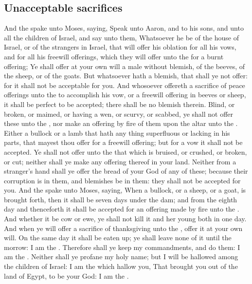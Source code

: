 \begin{biblechapter}
\section*{Unacceptable sacrifices}
\verse And the \LORD spake unto Moses, saying,
\verse Speak unto Aaron, and to his sons, and unto all the children of Israel, and say unto them, Whatsoever he be of the house of Israel, or of the strangers in Israel, that will offer his oblation for all his vows, and for all his freewill offerings, which they will offer unto the \LORD for a burnt offering;
\verse Ye shall offer at your own will a male without blemish, of the beeves, of the sheep, or of the goats.
\verse But whatsoever hath a blemish, that shall ye not offer: for it shall not be acceptable for you.
\verse And whosoever offereth a sacrifice of peace offerings unto the \LORD to accomplish his vow, or a freewill offering in beeves or sheep, it shall be perfect to be accepted; there shall be no blemish therein.
\verse Blind, or broken, or maimed, or having a wen, or scurvy, or scabbed, ye shall not offer these unto the \LORD, nor make an offering by fire of them upon the altar unto the \LORD.
\verse Either a bullock or a lamb that hath any thing superfluous or lacking in his parts, that mayest thou offer for a freewill offering; but for a vow it shall not be accepted.
\verse Ye shall not offer unto the \LORD that which is bruised, or crushed, or broken, or cut; neither shall ye make any offering thereof in your land.
\verse Neither from a stranger's hand shall ye offer the bread of your God of any of these; because their corruption is in them, and blemishes be in them: they shall not be accepted for you.
\verse And the \LORD spake unto Moses, saying,
\verse When a bullock, or a sheep, or a goat, is brought forth, then it shall be seven days under the dam; and from the eighth day and thenceforth it shall be accepted for an offering made by fire unto the \LORD.
\verse And whether it be cow or ewe, ye shall not kill it and her young both in one day.
\verse And when ye will offer a sacrifice of thanksgiving unto the \LORD, offer it at your own will.
\verse On the same day it shall be eaten up; ye shall leave none of it until the morrow: I am the \LORD.
\verse Therefore shall ye keep my commandments, and do them: I am the \LORD.
\verse Neither shall ye profane my holy name; but I will be hallowed among the children of Israel: I am the \LORD which hallow you,
\verse That brought you out of the land of Egypt, to be your God: I am the \LORD.
\end{biblechapter}

